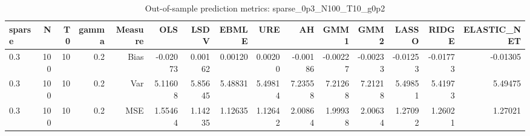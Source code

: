 \begin{table}[!htbp]\centering
\caption{Out-of-sample prediction metrics: sparse_0p3_N100_T10_g0p2}
\label{tab:table3_sparse_0p3_N100_T10_g0p2}
\begin{tabular}{lrrrrrrrrrrrrrr}
\hline
sparse & N & T0 & gamma & Measure & OLS & LSDV & EBMLE & URE & AH & GMM1 & GMM2 & LASSO & RIDGE & ELASTIC_NET \\
\hline
0.3 & 100 & 10 & 0.2 & Bias & -0.02073 & 0.00162 & 0.00120 & 0.00200 & -0.00186 & -0.00227 & -0.00233 & -0.01253 & -0.01773 & -0.01305 \\
0.3 & 100 & 10 & 0.2 & Var & 5.11608 & 5.85645 & 5.48831 & 5.49814 & 7.23558 & 7.21268 & 7.21218 & 5.49851 & 5.41973 & 5.49475 \\
0.3 & 100 & 10 & 0.2 & MSE & 1.55464 & 1.14235 & 1.12635 & 1.12642 & 2.00864 & 1.99938 & 2.00634 & 1.27092 & 1.26021 & 1.27021 \\
\hline
\end{tabular}
\end{table}

